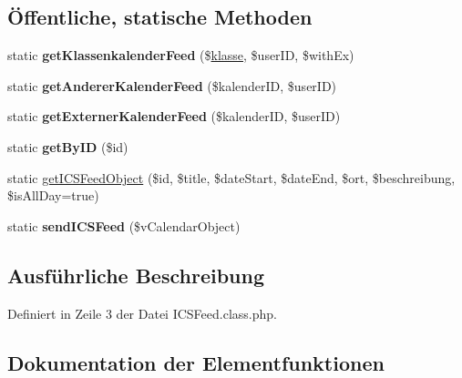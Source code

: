 \subsection*{Öffentliche, statische Methoden}
\begin{DoxyCompactItemize}
\item 
\mbox{\label{class_i_c_s_feed_a16742a17e5560670673448a025adf540}} 
static {\bfseries get\+Klassenkalender\+Feed} (\$\mbox{\hyperlink{classklasse}{klasse}}, \$user\+ID, \$with\+Ex)
\item 
\mbox{\label{class_i_c_s_feed_ac5c2dca7e804445ec36e15fa736807f0}} 
static {\bfseries get\+Anderer\+Kalender\+Feed} (\$kalender\+ID, \$user\+ID)
\item 
\mbox{\label{class_i_c_s_feed_a50d8654f2457e55a2de3c862095d7131}} 
static {\bfseries get\+Externer\+Kalender\+Feed} (\$kalender\+ID, \$user\+ID)
\item 
\mbox{\label{class_i_c_s_feed_aba8f21dba73db5f1c50b3766f30d9637}} 
static {\bfseries get\+By\+ID} (\$id)
\item 
static \mbox{\hyperlink{class_i_c_s_feed_a4c901d54d7792293072f13395f240085}{get\+I\+C\+S\+Feed\+Object}} (\$id, \$title, \$date\+Start, \$date\+End, \$ort, \$beschreibung, \$is\+All\+Day=true)
\item 
\mbox{\label{class_i_c_s_feed_acb0f763f1a62bda1d05023eb71c428a6}} 
static {\bfseries send\+I\+C\+S\+Feed} (\$v\+Calendar\+Object)
\end{DoxyCompactItemize}


\subsection{Ausführliche Beschreibung}


Definiert in Zeile 3 der Datei I\+C\+S\+Feed.\+class.\+php.



\subsection{Dokumentation der Elementfunktionen}
\mbox{\label{class_i_c_s_feed_a4c901d54d7792293072f13395f240085}} 
